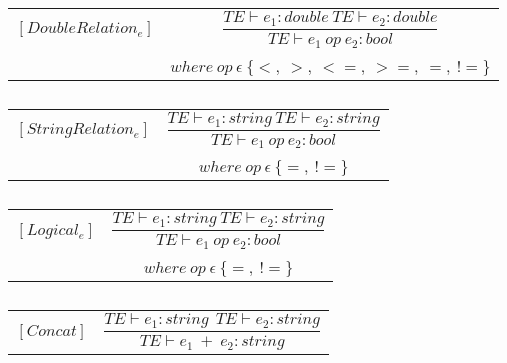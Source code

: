 \begin{table}[H]
    \begin{center}
    \begin{longtable}[c] { r c }
        $[DoubleRelation_{e}]$ 
        & 
        \( \dfrac{T E  \vdash  e_1  : double \ T E  \vdash  e_2  :  double}{T E  \vdash  e_1 \ op \ e_2  :  bool} \) 
        \\ \\
        & 
        \( {where \ op \ \epsilon \ \{<,\ >,\ < =,\ >=,\ =,\ !=\}} \)
    \end{longtable}
    \caption{}\label{type:double-relation}
        \end{center}
\end{table}
\begin{table}[H]
    \begin{center}
    \begin{longtable}[c] { r c }
        $[StringRelation_{e}]$ 
        & 
        \( \dfrac{T E  \vdash  e_1  :  string \ TE  \vdash  e_2  :  string }{TE  \vdash  e_1 \ op \ e_2  :  bool} \) 
        \\ \\
        & 
        \( {where \ op \ \epsilon \ \{=, \ !=\}} \)
    \end{longtable}
    \caption{}\label{type:string-relation}
        \end{center}
\end{table}


\begin{table}[H]
    \begin{center}
    \begin{longtable}[c] { r c }
        $[Logical_{e}]$ 
        & 
        \( \dfrac{T E  \vdash  e_1  :  string \ TE  \vdash  e_2  :  string }{T E  \vdash  e_1 \ op \ e_2  :  bool} \) 
        \\ \\
        & 
        \( {where \ op \ \epsilon \ \{=,\ !=\}} \)
    \end{longtable}
    \caption{}\label{type:logical-expr}
        \end{center}
\end{table}

\begin{table}[H]
    \begin{center}
    \begin{longtable}[c] { r c }
        $[Concat]$ 
        & 
        \( \dfrac{TE \vdash  e_1  :  string \ \ TE  \vdash  e_2  :  string }{TE \vdash  e_1 \ + \ e_2  :  string} \) 
    \end{longtable}
    \caption{}\label{type:string-concat}
        \end{center}
\end{table}

